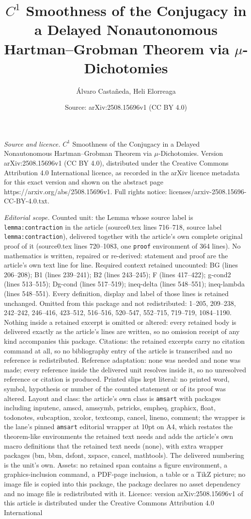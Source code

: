 \documentclass[10pt,a4paper]{amsart}
\title[$C^{1}$ Smoothness of the Conjugacy in a Delayed Nonautonomo]{$C^{1}$ Smoothness of the Conjugacy in a Delayed Nonautonomous Hartman--Grobman Theorem via $\mu$-Dichotomies}
\author{\'Alvaro Casta\~neda, Heli Elorreaga}
\date{Source: arXiv:2508.15696v1 (CC BY 4.0)}
\begin{document}
\maketitle

\noindent\emph{Source and licence.} $C^{1}$ Smoothness of the Conjugacy in a Delayed Nonautonomous Hartman--Grobman Theorem via $\mu$-Dichotomies. Version arXiv:2508.15696v1 (CC BY 4.0), distributed under the Creative Commons Attribution 4.0 International licence, as recorded in the arXiv licence metadata for this exact version and shown on the abstract page https://arxiv.org/abs/2508.15696v1. Full rights notice: licenses/arxiv-2508.15696-CC-BY-4.0.txt.\par\smallskip

\noindent\textit{Editorial scope.} Counted unit: the Lemma whose source label is \texttt{lemma:contraction} in the article (source0.tex lines 716--718, source label \texttt{lemma:contraction}), delivered together with the article's own complete original proof of it (source0.tex lines 720--1083, one \texttt{proof} environment of 364 lines). No mathematics is written, repaired or re-derived: statement and proof are the article's own text line for line. Required context retained uncounted: BG (lines 206--208); B1 (lines 239--241); B2 (lines 243--245); F (lines 417--422); g-cond2 (lines 513--515); Dg-cond (lines 517--519); ineq-delta (lines 548--551); ineq-lambda (lines 548--551). Every definition, display and label of those lines is retained unchanged. Omitted from this package and not redistributed: 1--205, 209--238, 242--242, 246--416, 423--512, 516--516, 520--547, 552--715, 719--719, 1084--1190. Nothing inside a retained excerpt is omitted or altered: every retained body is delivered exactly as the article's lines are written, so no omission receipt of any kind accompanies this package. Citations: the retained excerpts carry no citation command at all, so no bibliography entry of the article is transcribed and no reference is redistributed. Reference adaptation: none was needed and none was made; every reference inside the delivered unit resolves inside it, so no unresolved reference or citation is produced. Printed slips kept literal: no printed word, symbol, hypothesis or number of the counted statement or of its proof was altered. Layout and class: the article's own class is \texttt{amsart} with packages including inputenc, amscd, amssymb, pstricks, empheq, graphicx, float, todonotes, subcaption, xcolor, textcomp, cancel, lineno, comment; the wrapper is the lane's pinned \texttt{amsart} editorial wrapper at 10pt on A4, which restates the theorem-like environments the retained text needs and adds the article's own macro definitions that the retained text needs (none), with extra wrapper packages (bm, bbm, dsfont, xspace, cancel, mathtools). The delivered numbering is the unit's own. Assets: no retained span contains a figure environment, a graphics-inclusion command, a PDF-page inclusion, a table or a TikZ picture; no image file is copied into this package, the package declares no asset dependency and no image file is redistributed with it. Licence: version arXiv:2508.15696v1 of this article is distributed under the Creative Commons Attribution 4.0 International 
\end{document}
